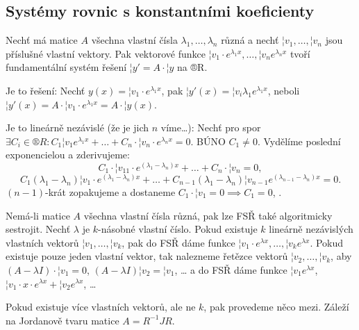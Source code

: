 \documentclass[12pt]{article}                   %
\begin{document}

    \subsection{Systémy rovnic s konstantními koeficienty}
        \begin{veta}
            Nechť má matice $A$ všechna vlastní čísla $\lambda_1, …, \lambda_n$ různá a nechť $¦v_1, …, ¦v_n$ jsou příslušné vlastní vektory. Pak vektorové funkce $¦v_1·e^{\lambda_1 x}, …, ¦v_ne^{\lambda_n x}$ tvoří fundamentální systém řešení $¦y' = A·¦y$ na ®R.

            \begin{dukazin}
                Je to řešení: Nechť $y(x) = ¦v_1 · e^{\lambda_1 x}$, pak $¦y'(x) = ¦v_i \lambda_1 e^{\lambda_1 x}$, neboli $¦y'(x) = A·¦v_1 · e^{\lambda_1 x} = A·¦y(x)$.

                Je to lineárně nezávislé (že je jich $n$ víme…): Nechť pro spor $\exists C_i \in ®R: C_1¦v_1e^{\lambda_1 x} + … + C_n·¦v_n·e^{\lambda_n x} = 0$. BÚNO $C_1 ≠ 0$. Vydělíme poslední exponencielou a zderivujeme:
                $$ C_1·¦v_{11}·e^{(\lambda_1 - \lambda_n) x} + … + C_n · ¦v_n = 0, $$
                $$ C_1(\lambda_1 - \lambda_n)¦v_1·e^{(\lambda_1 - \lambda_n) x} + …+ C_{n-1}(\lambda_1 - \lambda_n)¦v_{n-1}e^{(\lambda_{n-1} - \lambda_n) x} = 0. $$
                $(n-1)$-krát zopakujeme a dostaneme $C_1·¦v_1 = 0 \implies C_1 = 0$, \lightning.
            \end{dukazin}
        \end{veta}

        \begin{poznamka}
            Nemá-li matice $A$ všechna vlastní čísla různá, pak lze FSŘ také algoritmicky sestrojit. Nechť $\lambda$ je $k$-násobné vlastní číslo. Pokud existuje $k$ lineárně nezávislých vlastních vektorů $¦v_1, …, ¦v_k$, pak do FSŘ dáme funkce $¦v_1·e^{\lambda x}, …, ¦v_ke^{\lambda x}$. Pokud existuje pouze jeden vlastní vektor, tak nalezneme řetězce vektorů $¦v_2, …, ¦v_k$, aby $(A - \lambda I)·¦v_1 = 0$, $(A - \lambda I)¦v_2 = ¦v_1$, … a do FSŘ dáme funkce $¦v_1e^{\lambda x}$, $¦v_1·x·e^{\lambda x} + ¦v_2e^{\lambda x}$, …

            Pokud existuje více vlastních vektorů, ale ne $k$, pak provedeme něco mezi. Záleží na Jordanově tvaru matice $A = R^{-1}JR$.
        \end{poznamka}

\end{document}
